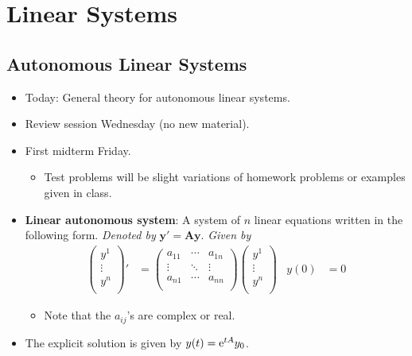 \documentclass[../notes.tex]{subfiles}
\begin{document}
\chapter{Linear Systems}
\section{Autonomous Linear Systems}
\begin{itemize}
    \item {}Today: General theory for autonomous linear systems.
    \item Review session Wednesday (no new material).
    \item First midterm Friday.
    \begin{itemize}
        \item Test problems will be slight variations of homework problems or examples given in class.
    \end{itemize}
    \item \textbf{Linear autonomous system}: A system of $n$ linear equations written in the following form. \emph{Denoted by} $\bm{y'=Ay}$. \emph{Given by}
    \begin{align*}
        \begin{pmatrix}
            y^1\\
            \vdots\\
            y^n\\
        \end{pmatrix}'
        &= 
        \begin{pmatrix}
            a_{11} & \cdots & a_{1n}\\
            \vdots & \ddots & \vdots\\
            a_{n1} & \cdots & a_{nn}\\
        \end{pmatrix}
        \begin{pmatrix}
            y^1\\
            \vdots\\
            y^n\\
        \end{pmatrix}&
        y(0) &= 0
    \end{align*}
    \begin{itemize}
        \item Note that the $a_{ij}$'s are complex or real.
    \end{itemize}
    \item The explicit solution is given by $y(t)=\e[tA]y_0$.

\end{itemize}
\end{document}
